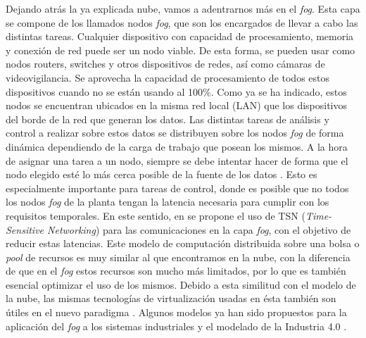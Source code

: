 Dejando atrás la ya explicada nube, vamos a adentrarnos más en el \textit{fog}.
Esta capa se compone de los llamados nodos \textit{fog}, que son los encargados
de llevar a cabo las distintas tareas. Cualquier dispositivo con capacidad de
procesamiento, memoria y conexión de red puede ser un nodo viable. De esta
forma, se pueden usar como nodos routers, switches y otros dispositivos de
redes, así como cámaras de videovigilancia. Se aprovecha la capacidad de
procesamiento de todos estos dispositivos cuando no se están usando al 100\%.
Como ya se ha indicado, estos nodos se encuentran ubicados en la misma red local
(LAN) que los dispositivos del borde de la red que generan los datos. Las
distintas tareas de análisis y control a realizar sobre estos datos se
distribuyen sobre los nodos \textit{fog} de forma dinámica dependiendo de la
carga de trabajo que posean los mismos. A la hora de asignar una tarea a un
nodo, siempre se debe intentar hacer de forma que el nodo elegido esté lo más
cerca posible de la fuente de los datos \cite{gedeon_fog_2018}. Esto es
especialmente importante para tareas de control, donde es posible que no todos
los nodos \textit{fog} de la planta tengan la latencia necesaria para cumplir
con los requisitos temporales. En este sentido, en \cite{pop_enabling_2018} se
propone el uso de TSN (\textit{Time-Sensitive Networking}) para las
comunicaciones en la capa \textit{fog}, con el objetivo de reducir estas
latencias. Este modelo de computación distribuida sobre una bolsa o
\textit{pool} de recursos es muy similar al que encontramos en la nube, con la
diferencia de que en el \textit{fog} estos recursos son mucho más limitados, por
lo que es también esencial optimizar el uso de los mismos. Debido a esta
similitud con el modelo de la nube, las mismas tecnologías de virtualización
usadas en ésta también son útiles en el nuevo paradigma \cite{yi_fog_2015}.
Algunos modelos ya han sido propuestos para la aplicación del \textit{fog} a los
sistemas industriales y el modelado de la Industria 4.0
\cite{verba_modeling_2019} \cite{tseng_lightweight_2018}.

